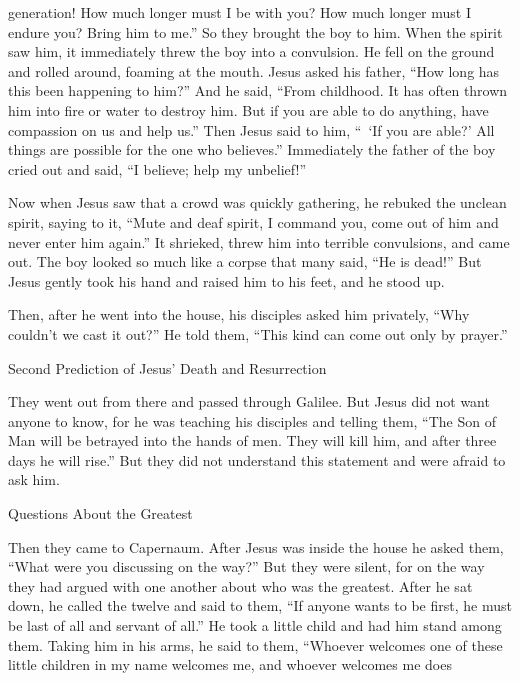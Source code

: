 {generation! How much longer
must I be
with
you? How much longer
must I endure
you? Bring
him
to
me.”
So
they brought
the boy
to
him.
When
the spirit
saw
him,
it
immediately
threw
the boy
into a convulsion. He fell
on
the ground
and rolled around,
foaming at the mouth.
Jesus asked
his
father,
“How
long
has
this
been happening
to him?” And
he said,
“From
childhood.
It has
often
thrown
him
into
fire
or
water
to
destroy
him.
But
if
you are able
to do anything, have compassion
on
us
and help
us.”
Then Jesus
said
to him,
“ ‘If
you are able?’ All things
are possible
for the one who believes.”
Immediately
the father
of the boy
cried out
and said,
“I believe;
help
my
unbelief!”
\par }{\PP {}Now when
Jesus
saw
that
a crowd
was
quickly gathering,
he rebuked
the unclean
spirit,
saying
to it,
“Mute
and
deaf
spirit,
I
command
you,
come out
of
him
and
never
enter
him again.”
It shrieked,
threw
him into
terrible
convulsions,
and
came out.
The boy looked
so much like
a corpse
that
many
said,
“He is dead!”
But
Jesus
gently took
his
hand
and raised
him
to his feet, and
he stood up.
\par }{\PP {}Then,
after
he
went
into
the house,
his
disciples
asked
him
privately,
“Why couldn’t
we
cast
it
out?”
He
told
them,
“This
kind
can
come out
only
by
prayer.”
\par }{\SH Second Prediction of Jesus’ Death and Resurrection
\par }{\PP {}They went out
from there
and passed
through
Galilee.
But
Jesus did
not
want
anyone
to know,
for
he was teaching
his
disciples
and
telling
them,
“The Son
of Man
will be betrayed
into
the hands
of men.
They will kill
him,
and
after
three
days
he will rise.”
But
they did not understand
this statement
and
were afraid
to ask
him.
\par }{\SH Questions About the Greatest
\par }{\PP {}Then
they came
to
Capernaum.
After
Jesus was
inside
the house
he asked
them,
“What
were you discussing
on
the way?”
But
they were silent,
for
on
the way
they had argued
with
one another
about who was
the greatest.
After
he sat down,
he called
the twelve
and
said
to them,
“If
anyone
wants
to be
first,
he must be
last
of all
and
servant
of all.”
He
took
a little child
and had
him
stand
among
them.
Taking
him
in
his arms,
he said
to them,
“Whoever
welcomes
one
of these
little children
in
my
name
welcomes
me,
and
whoever
welcomes
me
does
}
